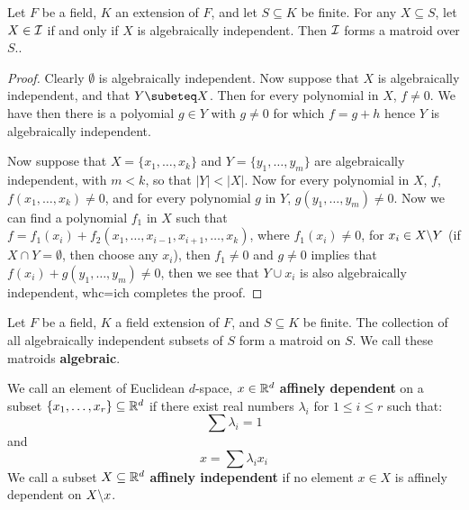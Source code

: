 \begin{theorem}\label{1.2.5}
    Let $F$ be a field,  $K$ an extension of  $F$, and let  $S \subseteq K$ be finite.  For any $X
    \subseteq S$, let  $X \in \mathcal{I}$ if and only if  $X$ is algebraically independent. Then  $\mathcal{I}$
    forms a matroid over  $S$..
\end{theorem}
\begin{proof}
    Clearly $\emptyset$ is algebraically independent. Now suppose that $X$
    is algebraically independent, and that  $Y \subeteq X$. Then for every polynomial 
    in $X$, $f \neq 0$. We have then there is a polyomial $g \in Y$ with $g \neq 0$ for which
     $f=g+h$ hence $Y$ is algebraically independent.

     Now suppose that $X=\{x_1, \dots, x_k\}$ and $Y=\{y_1, \dots, y_m\}$ are algebraically
     independent, with $m<k$, so that  $|Y|<|X|$. Now for every polynomial in $X$, $f$, $f(x_1,
     \dots, x_k) \neq 0$, and for every polynomial $g$ in  $Y$,  $g(y_1, \dots, y_m) \neq 0$. Now we
     can find a polynomial $ f_1$ in $X$ such that  $f=f_1(x_i)+f_2(x_1, \dots, x_{i-1},x_{i+1},
     \dots, x_k)$, where $ f_1(x_i) \neq 0$, for $x_i \in X\backslash Y$ (if $X \cap Y=\emptyset$, then
     choose any  $x_i$), then $f_1 \neq 0$ and $g \neq 0$ implies that  $f(x_i)+g(y_1, \dots, y_m)
     \neq 0$, then we see that $Y \cup x_i$ is also algebraically independent, whc=ich completes the
     proof.
\end{proof}

\begin{definition}
    Let $F$ be a field,  $K$ a field extension of  $F$, and  $S \subseteq K$ be finite. The
    collection of all algebraically independent subsets of  $S$ form a matroid on  $S$. We call
    these matroids \textbf {algebraic}.		
\end{definition}

\begin{definition}
    We call an element of Euclidean $d$-space, $x \in \mathbb{R}^d$ \textbf{affinely dependent} on a subset
    $\{x_1, \dots, x_r\} \subseteq \mathbb{R}^d$ if there exist real numbers $\lambda_i$ for  $1 \leq i \leq
    r$ such that:
        \begin{equation}
            \sum{\lambda_i}=1
        \end{equation}
    and
        \begin{equation}
            x=\sum{\lambda_ix_i}
        \end{equation} 
        We call a subset $X \subseteq \mathbb{R}^d$ \textbf {affinely independent} if no element $x \in X$ is
        affinely dependent on  $X\backslash x$.
\end{definition}

